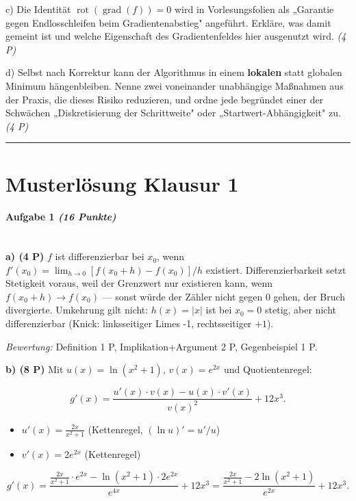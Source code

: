 \documentclass[11pt, a4paper]{article}
\begin{document}
c) Die Identität $\operatorname{rot}(\operatorname{grad}(f)) = 0$ wird in Vorlesungsfolien als „Garantie gegen Endlosschleifen beim Gradientenabstieg" angeführt. Erkläre, was damit gemeint ist und welche Eigenschaft des Gradientenfeldes hier ausgenutzt wird. \textit{(4 P)}


d) Selbst nach Korrektur kann der Algorithmus in einem \textbf{lokalen} statt globalen Minimum hängenbleiben. Nenne zwei voneinander unabhängige Maßnahmen aus der Praxis, die dieses Risiko reduzieren, und ordne jede begründet einer der Schwächen „Diskretisierung der Schrittweite" oder „Startwert-Abhängigkeit" zu. \textit{(4 P)}



\noindent\textcolor{rulegray}{\rule{\linewidth}{0.4pt}}



\section{Musterlösung Klausur 1}

\paragraph{Aufgabe 1 \textit{(16 Punkte)}}\mbox{}\\[2pt]

\textbf{a) (4 P)} $f$ ist differenzierbar bei $x_0$, wenn $f'(x_0) = \lim_{h\to 0} [f(x_0+h)-f(x_0)]/h$ existiert. Differenzierbarkeit setzt Stetigkeit voraus, weil der Grenzwert nur existieren kann, wenn $f(x_0+h) \to f(x_0)$ — sonst würde der Zähler nicht gegen 0 gehen, der Bruch divergierte. Umkehrung gilt nicht: $h(x) = |x|$ ist bei $x_0 = 0$ stetig, aber nicht differenzierbar (Knick: linksseitiger Limes -1, rechtsseitiger $+1$).

\textit{Bewertung:} Definition 1 P, Implikation+Argument 2 P, Gegenbeispiel 1 P.


\textbf{b) (8 P)} Mit $u(x) = \ln(x^2+1)$, $v(x) = e^{2x}$ und Quotientenregel:

\[
g'(x) = \frac{u'(x)\cdot v(x) - u(x)\cdot v'(x)}{v(x)^2} + 12x^3.
\]

\begin{itemize}
  \item $u'(x) = \frac{2x}{x^2+1}$ (Kettenregel, $(\ln u)' = u'/u$)
  \item $v'(x) = 2e^{2x}$ (Kettenregel)
\end{itemize}

\[
g'(x) = \frac{\tfrac{2x}{x^2+1}\cdot e^{2x} - \ln(x^2+1)\cdot 2e^{2x}}{e^{4x}} + 12x^3 = \frac{\tfrac{2x}{x^2+1} - 2\ln(x^2+1)}{e^{2x}} + 12x^3.
\]
\end{document}
